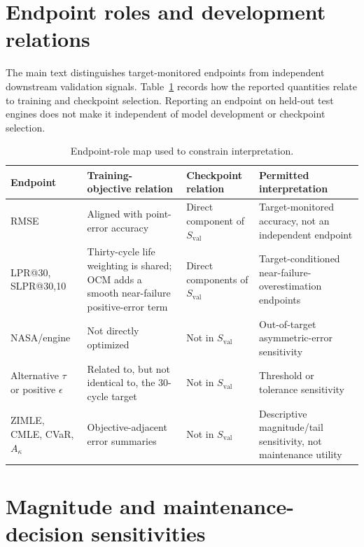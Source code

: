 \documentclass[11pt,a4paper]{article}
\begin{document}




\section{Endpoint roles and development relations}

The main text distinguishes target-monitored endpoints from independent downstream validation signals. Table~\ref{tab:endpoint-role} records how the reported quantities relate to training and checkpoint selection. Reporting an endpoint on held-out test engines does not make it independent of model development or checkpoint selection.

\begin{table}[H]
\centering
\small
\caption{Endpoint-role map used to constrain interpretation.}
\label{tab:endpoint-role}
\begin{tabular}{@{}p{}p{}p{}p{}@{}}
\toprule
Endpoint & Training-objective relation & Checkpoint relation & Permitted interpretation \\
\midrule
RMSE & Aligned with point-error accuracy & Direct component of $S_{\mathrm{val}}$ & Target-monitored accuracy, not an independent endpoint \\
LPR@30, SLPR@30,10 & Thirty-cycle life weighting is shared; OCM adds a smooth near-failure positive-error term & Direct components of $S_{\mathrm{val}}$ & Target-conditioned near-failure-overestimation endpoints \\
NASA/engine & Not directly optimized & Not in $S_{\mathrm{val}}$ & Out-of-target asymmetric-error sensitivity \\
Alternative $\tau$ or positive $\epsilon$ & Related to, but not identical to, the 30-cycle target & Not in $S_{\mathrm{val}}$ & Threshold or tolerance sensitivity \\
ZIMLE, CMLE, CVaR, $A_\kappa$ & Objective-adjacent error summaries & Not in $S_{\mathrm{val}}$ & Descriptive magnitude/tail sensitivity, not maintenance utility \\
\bottomrule
\end{tabular}
\end{table}

\section{Magnitude and maintenance-decision sensitivities}
\end{document}
